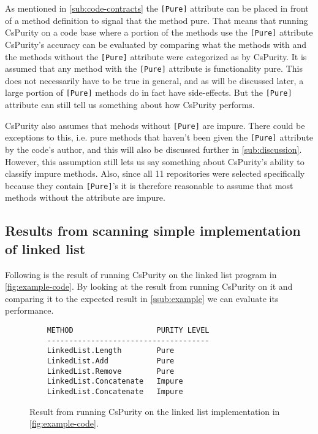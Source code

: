 \documentclass[a4paper,12pt]{article}
\begin{document}
As mentioned in \autoref{sub:code-contracts} the \texttt{[Pure]} attribute can be placed in front of a method definition to signal that the method pure. That means that running CsPurity on a code base where a portion of the methods use the \texttt{[Pure]} attribute CsPurity's accuracy can be evaluated by comparing what the methods with and the methods without the \texttt{[Pure]} attribute were categorized as by CsPurity. It is assumed that any method with the \texttt{[Pure]} attribute is functionality pure. This does not necessarily have to be true in general, and as will be discussed later, a large portion of \texttt{[Pure]} methods do in fact have side-effects. But the \texttt{[Pure]} attribute can still tell us something about how CsPurity performs.

CsPurity also assumes that mehods without \texttt{[Pure]} are impure. There could be exceptions to this, i.e. pure methods that haven't been given the \texttt{[Pure]} attribute by the code's author, and this will also be discussed further in \autoref{sub:discussion}. However, this assumption still lets us say something about CsPurity's ability to classify impure methods. Also, since all 11 repositories were selected specifically because they contain \texttt{[Pure]}'s it is therefore reasonable to assume that most methods without the attribute are impure.

\subsection{Results from scanning simple implementation of linked list} \label{sub:results-from-scanning-the-example-list}
Following is the result of running CsPurity on the linked list program in \autoref{fig:example-code}. By looking at the result from running CsPurity on it and comparing it to the expected result in \autoref{ssub:example} we can evaluate its performance.

\begin{figure}[htpb]
  \centering
  \begin{minipage}{\linewidth} %
    \begin{lstlisting}
    METHOD                   PURITY LEVEL
    -------------------------------------
    LinkedList.Length        Pure
    LinkedList.Add           Pure
    LinkedList.Remove        Pure
    LinkedList.Concatenate   Impure
    LinkedList.Concatenate   Impure
    \end{lstlisting}
  \end{minipage}
  \caption{Result from running CsPurity on the linked list implementation in \autoref{fig:example-code}.}
  \label{fig:example-result}
\end{figure}
\end{document}
